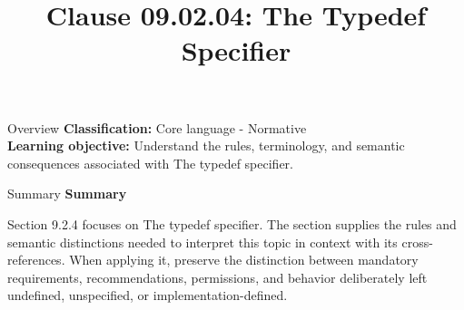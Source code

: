 \documentclass[10pt,letterpaper]{article}
\title{Clause 09.02.04: The Typedef Specifier}
\author{}
\date{}
\begin{document}
\maketitle
\begin{CornellOverviewBox}{Overview}
\textbf{Classification:} Core language - Normative\\[2pt]
\textbf{Learning objective:} Understand the rules, terminology, and semantic consequences associated with The typedef specifier.
\end{CornellOverviewBox}\begin{CornellSummaryBox}{Summary}
{\sffamily\bfseries\color{Accent} Summary}\par\vspace{3pt}Section 9.2.4 focuses on The typedef specifier. The section supplies the rules and semantic distinctions needed to interpret this topic in context with its cross-references. When applying it, preserve the distinction between mandatory requirements, recommendations, permissions, and behavior deliberately left undefined, unspecified, or implementation-defined.
\end{CornellSummaryBox}
\end{document}
